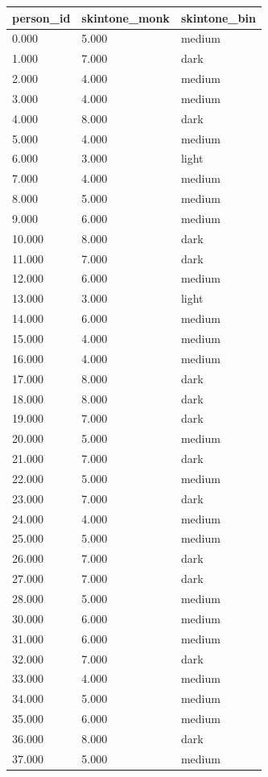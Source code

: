 \begin{tabular}{lll}
\toprule
person\_id & skintone\_monk & skintone\_bin \\
\midrule
0.000 & 5.000 & medium \\
1.000 & 7.000 & dark \\
2.000 & 4.000 & medium \\
3.000 & 4.000 & medium \\
4.000 & 8.000 & dark \\
5.000 & 4.000 & medium \\
6.000 & 3.000 & light \\
7.000 & 4.000 & medium \\
8.000 & 5.000 & medium \\
9.000 & 6.000 & medium \\
10.000 & 8.000 & dark \\
11.000 & 7.000 & dark \\
12.000 & 6.000 & medium \\
13.000 & 3.000 & light \\
14.000 & 6.000 & medium \\
15.000 & 4.000 & medium \\
16.000 & 4.000 & medium \\
17.000 & 8.000 & dark \\
18.000 & 8.000 & dark \\
19.000 & 7.000 & dark \\
20.000 & 5.000 & medium \\
21.000 & 7.000 & dark \\
22.000 & 5.000 & medium \\
23.000 & 7.000 & dark \\
24.000 & 4.000 & medium \\
25.000 & 5.000 & medium \\
26.000 & 7.000 & dark \\
27.000 & 7.000 & dark \\
28.000 & 5.000 & medium \\
30.000 & 6.000 & medium \\
31.000 & 6.000 & medium \\
32.000 & 7.000 & dark \\
33.000 & 4.000 & medium \\
34.000 & 5.000 & medium \\
35.000 & 6.000 & medium \\
36.000 & 8.000 & dark \\
37.000 & 5.000 & medium \\

\end{tabular}

